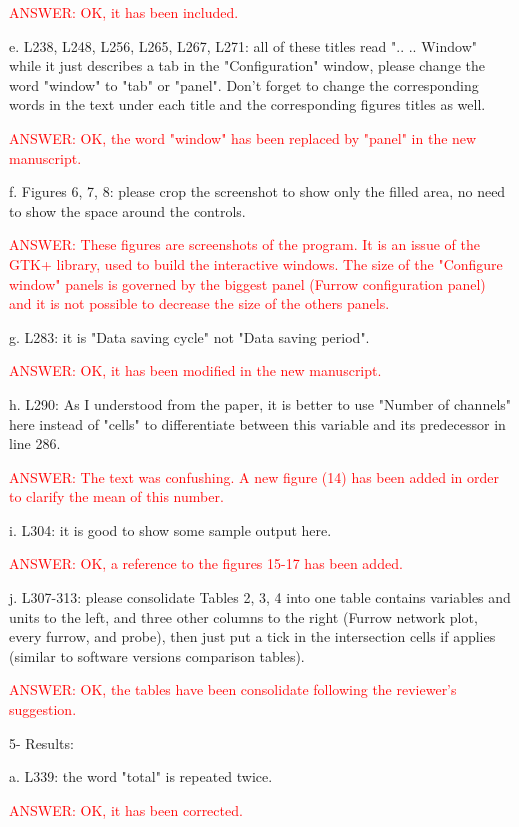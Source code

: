 \documentclass[a4paper]{article}
\begin{document}
\textcolor{red}{ANSWER: OK, it has been included.}

e. L238, L248, L256, L265, L267, L271: all of these titles read ".. .. Window" while it just describes a tab in the "Configuration" window, please change the word "window" to "tab" or "panel". Don't forget to change the corresponding words in the text under each title and the corresponding figures titles as well.

\textcolor{red}{ANSWER: OK, the word "window" has been replaced by "panel" in
the new manuscript.}

f. Figures 6, 7, 8: please crop the screenshot to show only the filled area, no need to show the space around the controls.

\textcolor{red}{ANSWER: These figures are screenshots of the program. It is an
issue of the GTK+ library, used to build the interactive windows. The size of
the "Configure window" panels is governed by the biggest panel (Furrow
configuration panel) and it is not possible to decrease the size of the others
panels.}

g. L283: it is "Data saving cycle" not "Data saving period".

\textcolor{red}{ANSWER: OK, it has been modified in the new manuscript.}

h. L290: As I understood from the paper, it is better to use "Number of channels" here instead of "cells" to differentiate between this variable and its predecessor in line 286.

\textcolor{red}{ANSWER: The text was confushing. A new figure (14) has been
added in order to clarify the mean of this number.}

i. L304: it is good to show some sample output here.

\textcolor{red}{ANSWER: OK, a reference to the figures 15-17 has been added.}

j. L307-313: please consolidate Tables 2, 3, 4 into one table contains variables and units to the left, and three other columns to the right (Furrow network plot, every furrow, and probe), then just put a tick in the intersection cells if applies (similar to software versions comparison tables).

\textcolor{red}{ANSWER: OK, the tables have been consolidate following the
reviewer's suggestion.}

5- Results:

a. L339: the word "total" is repeated twice.

\textcolor{red}{ANSWER: OK, it has been corrected.}
\end{document}
